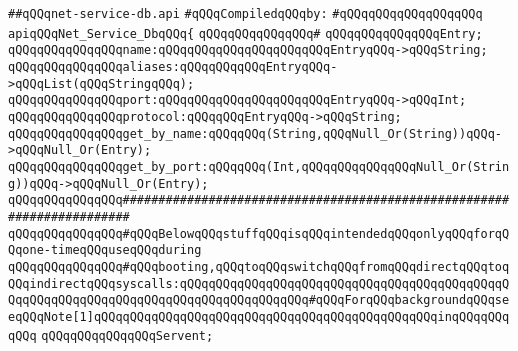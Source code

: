 \label{src/lib/std/src/socket/net-service-db.api}
\verb|##qQQqnet-service-db.api|\newline
\newline
\verb|#qQQqCompiledqQQqby:|\newline
\verb|#qQQqqQQqqQQqqQQqqQQq|\newline
\newline
\newline
\newline
\verb|apiqQQqNet_Service_DbqQQq{|\newline
\verb|qQQqqQQqqQQqqQQq#|\newline
\verb|qQQqqQQqqQQqqQQqEntry;|\newline
\newline
\verb|qQQqqQQqqQQqqQQqname:qQQqqQQqqQQqqQQqqQQqqQQqEntryqQQq->qQQqString;|\newline
\verb|qQQqqQQqqQQqqQQqaliases:qQQqqQQqqQQqEntryqQQq->qQQqList(qQQqStringqQQq);|\newline
\verb|qQQqqQQqqQQqqQQqport:qQQqqQQqqQQqqQQqqQQqqQQqEntryqQQq->qQQqInt;|\newline
\verb|qQQqqQQqqQQqqQQqprotocol:qQQqqQQqEntryqQQq->qQQqString;|\newline
\newline
\verb|qQQqqQQqqQQqqQQqget_by_name:qQQqqQQq(String,qQQqNull_Or(String))qQQq->qQQqNull_Or(Entry);|\newline
\verb|qQQqqQQqqQQqqQQqget_by_port:qQQqqQQq(Int,qQQqqQQqqQQqqQQqNull_Or(String))qQQq->qQQqNull_Or(Entry);|\newline
\newline
\verb|qQQqqQQqqQQqqQQq#######################################################################|\newline
\verb|qQQqqQQqqQQqqQQq#qQQqBelowqQQqstuffqQQqisqQQqintendedqQQqonlyqQQqforqQQqone-timeqQQquseqQQqduring|\newline
\verb|qQQqqQQqqQQqqQQq#qQQqbooting,qQQqtoqQQqswitchqQQqfromqQQqdirectqQQqtoqQQqindirectqQQqsyscalls:qQQqqQQqqQQqqQQqqQQqqQQqqQQqqQQqqQQqqQQqqQQqqQQqqQQqqQQqqQQqqQQqqQQqqQQqqQQqqQQqqQQqqQQq#qQQqForqQQqbackgroundqQQqseeqQQqNote[1]qQQqqQQqqQQqqQQqqQQqqQQqqQQqqQQqqQQqqQQqqQQqqQQqinqQQqqQQqqQQq|\newline
\newline
\verb|qQQqqQQqqQQqqQQqServent;|\newline
